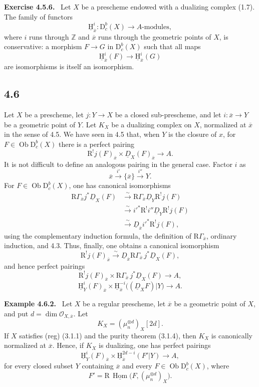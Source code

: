 \documentclass[12pt]{article}
\newcommand{\ZZ}{\mathbb Z}
\newcommand{\Hom}{\operatorname{Hom}}
\newcommand{\ob}{\operatorname{Ob}}
\newcommand{\D}{\mathrm D}
\newcommand{\R}{\mathrm R}
\newcommand{\cO}{\mathcal O}
\newcommand{\ol}[1]{\overline{#1}}
\newcommand{\uH}{\underline{\mathrm H}}
\newenvironment{statement}[1]{\par\medskip\noindent\textbf{#1.}\ }{\par\medskip}
\begin{document}
\begin{statement}{Exercise 4.5.6}
Let $X$ be a prescheme endowed with a dualizing complex (1.7). The family of functors
\[
   \uH^i_{\ol x}:\D_c^b(X)\longrightarrow A\text{-modules},
\]
where $i$ runs through $\ZZ$ and $\ol x$ runs through the geometric points of $X$, is conservative: a morphism $F\to G$ in $\D_c^b(X)$ such that all maps
\[
   \uH^i_{\ol x}(F)\longrightarrow \uH^i_{\ol x}(G)
\]
are isomorphisms is itself an isomorphism.
\end{statement}

\subsection*{4.6}
Let $X$ be a prescheme, let $j:Y\to X$ be a closed sub-prescheme, and let $i:\ol x\to Y$ be a geometric point of $Y$. Let $K_X$ be a dualizing complex on $X$, normalized at $\ol x$ in the sense of 4.5. We have seen in 4.5 that, when $Y$ is the closure of $x$, for $F\in\ob\D_c^b(X)$ there is a perfect pairing
\[
   \R^!j(F)_{\ol x}\times \underline D_X(F)_{\ol x}\longrightarrow A.
\]
It is not difficult to define an analogous pairing in the general case. Factor $i$ as
\[
   \ol x\xrightarrow{i'}\{\ol x\}\xrightarrow{i''}Y.
\]
For $F\in\ob\D_c^b(X)$, one has canonical isomorphisms
\[
\begin{aligned}
\R\Gamma_{\ol x}j^*\underline D_X(F)
&\xrightarrow{\sim}\R\Gamma_{\ol x}\underline D_Y\R^!j(F)\\
&\xrightarrow{\sim}i'^*\R^!i''\underline D_Y\R^!j(F)\\
&\xrightarrow{\sim}\underline D_{\ol x}i'^*\R^!j(F),
\end{aligned}
\]
using the complementary induction formula, the definition of $\R\Gamma_{\ol x}$, ordinary induction, and 4.3. Thus, finally, one obtains a canonical isomorphism
\[
   \R^!j(F)_{\ol x}
      \xrightarrow{\sim}
   \underline D_{\ol x}\R\Gamma_{\ol x}\,j^*\underline D_X(F),\tag{4.6.1}
\]
and hence perfect pairings
\[
   \R^!j(F)_{\ol x}\times
   \R\Gamma_{\ol x}\,j^*\underline D_X(F)\longrightarrow A,
\]
\[
   \uH^i_Y(F)_{\ol x}\times
   \uH^{-i}_{\ol x}\bigl((\underline D_XF)|Y\bigr)
      \longrightarrow A.\tag{4.6.1''}
\]

\begin{statement}{Example 4.6.2}
Let $X$ be a regular prescheme, let $\ol x$ be a geometric point of $X$, and put $d=\dim\cO_{X,\ol x}$. Let
\[
   K_X=(\mu_n^{\otimes d})_X[2d].
\]
If $X$ satisfies (reg) (3.1.1) and the purity theorem (3.1.4), then $K_X$ is canonically normalized at $\ol x$. Hence, if $K_X$ is dualizing, one has perfect pairings
\[
   \uH^i_Y(F)_{\ol x}\times
      \uH^{2d-i}_{\ol x}(F'|Y)\longrightarrow A,
\]
for every closed subset $Y$ containing $\ol x$ and every $F\in\ob\D_c^b(X)$, where
\[
   F'=\R\,\underline{\Hom}\bigl(F,(\mu_n^{\otimes d})_X\bigr).
\]
\end{statement}
\end{document}
